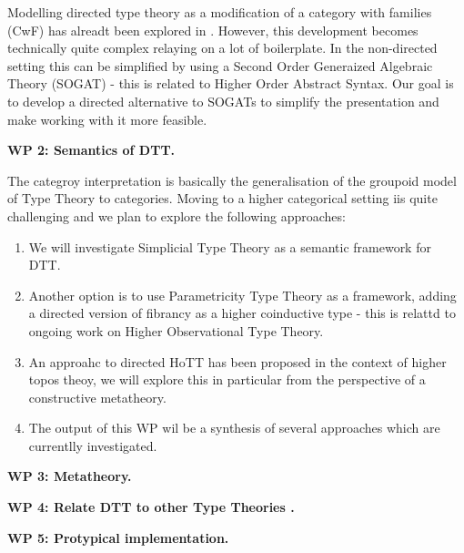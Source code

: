 \documentclass[a4paper,11pt]{article}
\let\oldcite\cite
\renewcommand*\cite[1]{{\protect\NoHyper\oldcite{#1}\protect\endNoHyper}}
\renewcommand{\paragraph}[1]{\textbf{#1.}}
\begin{document}
Modelling directed type theory as a modification of a category with
families (CwF) has alreadt been explored in
\cite{neumann-phd,altenkirch-neumann}.  However, this development
becomes technically quite complex relaying on a lot of boilerplate. In
the non-directed setting this can be simplified by using a Second
Order Generaized Algebraic Theory (SOGAT) - this is related to Higher
Order Abstract Syntax. Our goal is to develop a directed alternative
to SOGATs to simplify the presentation and make working with it more
feasible.

\paragraph{WP 2: Semantics of DTT}

The categroy interpretation is basically the generalisation of the
groupoid model of Type Theory to categories. Moving to a higher
categorical setting iis quite challenging and we plan to explore the
following approaches:
\begin{enumerate}
\item We will investigate Simplicial Type Theory \cite{Buchholz} as a
  semantic framework for DTT.
\item Another option is to use Parametricity Type Theory as a
  framework, adding a directed version of fibrancy as a higher
  coinductive type - this is relattd to ongoing work on Higher
  Observational Type Theory.
\item An approahc to directed HoTT has been proposed in the context of
  higher topos theoy, we will explore this in particular from the
  perspective of a constructive metatheory.
\item The output of this WP wil be a synthesis of several approaches
  which are currentlly investigated.
\end{enumerate}

\paragraph{WP 3: Metatheory}




\paragraph{WP 4: Relate DTT to other Type Theories }

\paragraph{WP 5: Protypical implementation}
\end{document}
